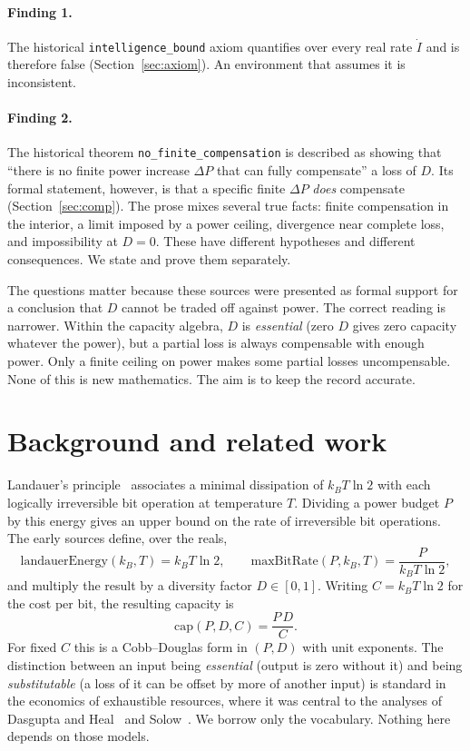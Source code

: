 \documentclass[11pt]{article}
\theoremstyle{remark}
\begin{document}
\paragraph{Finding 1.} The historical \texttt{intelligence\_bound} axiom quantifies over every
real rate $\dot I$ and is therefore false (Section~\ref{sec:axiom}). An environment that assumes
it is inconsistent.

\paragraph{Finding 2.} The historical theorem \texttt{no\_finite\_compensation} is described as
showing that ``there is no finite power increase $\Delta P$ that can fully compensate'' a loss of
$D$. Its formal statement, however, is that a specific finite $\Delta P$ \emph{does} compensate
(Section~\ref{sec:comp}). The prose mixes several true facts: finite compensation in the interior,
a limit imposed by a power ceiling, divergence near complete loss, and impossibility at $D=0$.
These have different hypotheses and different consequences. We state and prove them separately.

The questions matter because these sources were presented as formal support for a conclusion that
$D$ cannot be traded off against power. The correct reading is narrower. Within the capacity
algebra, $D$ is \emph{essential} (zero $D$ gives zero capacity whatever the power), but a partial
loss is always compensable with enough power. Only a finite ceiling on power makes some partial
losses uncompensable. None of this is new mathematics. The aim is to keep the record accurate.

\section{Background and related work}
Landauer's principle~\citep{landauer1961} associates a minimal dissipation of $k_B T\ln 2$ with
each logically irreversible bit operation at temperature $T$. Dividing a power budget $P$ by this
energy gives an upper bound on the rate of irreversible bit operations. The early sources define,
over the reals,
\[
  \mathrm{landauerEnergy}(k_B,T)=k_B T\ln 2,\qquad
  \mathrm{maxBitRate}(P,k_B,T)=\frac{P}{k_B T\ln 2},
\]
and multiply the result by a diversity factor $D\in[0,1]$. Writing $C=k_BT\ln2$ for the cost per
bit, the resulting capacity is
\[
  \mathrm{cap}(P,D,C)=\frac{P\,D}{C}.
\]
For fixed $C$ this is a Cobb--Douglas form in $(P,D)$ with unit exponents. The distinction between
an input being \emph{essential} (output is zero without it) and being \emph{substitutable} (a loss
of it can be offset by more of another input) is standard in the economics of exhaustible
resources, where it was central to the analyses of
Dasgupta and Heal~\citep{dasguptaheal1974} and Solow~\citep{solow1974}. We borrow only the
vocabulary. Nothing here depends on those models.
\end{document}
